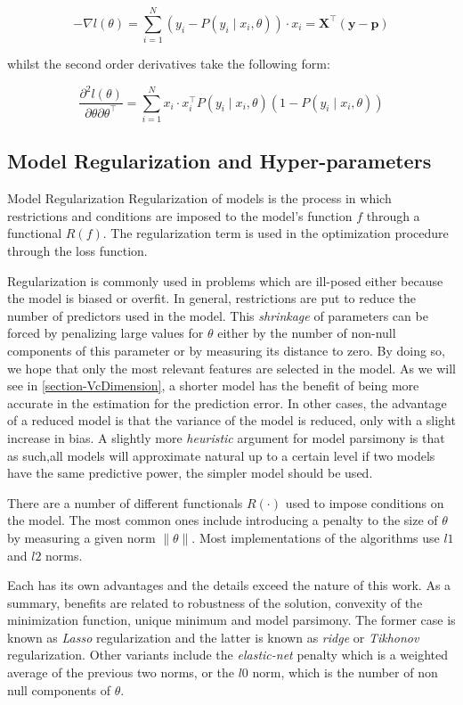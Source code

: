 \[
- \nabla  l(\theta) = \sum_{i=1}^N (y_i - P(y_i \mid x_i,\theta))\cdot x_i = \textbf{X}^{\intercal}(\textbf{y}-\textbf{p})
\]

whilst the second order derivatives take the following form:

\[
\frac{\partial^2 l(\theta)}{\partial \theta \partial \theta^\intercal} = \sum_{i=1}^N x_i \cdot x_i^\intercal P(y_i \mid x_i,\theta)(1 -P(y_i \mid x_i,\theta))
\]



\subsection{Model Regularization and Hyper-parameters}


\begin{definition}{Model Regularization}
	Regularization of models is the process in which restrictions and conditions are imposed  to the model's function $f$ through a functional $ R(f)$. The regularization term is used in the optimization procedure through the loss function.
\end{definition}

Regularization is commonly used in problems which are ill-posed either because the model is biased or overfit. In general, restrictions are put to reduce the number of predictors used in the model. This \textit{shrinkage} of parameters can be forced by penalizing large values for $\theta$ either by the number of non-null components of this parameter or by measuring its distance to zero. By doing so, we hope that only the most relevant features are selected in the model. As we will see in \ref{section-VcDimension}, a shorter model has the benefit of being more accurate in the estimation for the prediction error. In other cases, the advantage of a reduced model is that the variance of the model is reduced, only with a slight increase in bias. A slightly more \textit{heuristic} argument for model parsimony is that as such,all models will approximate natural up to a certain level if two models have the same predictive power, the simpler model should be used.


There are a number of different functionals $R(\cdot)$ used to impose conditions on the model. The most common ones include introducing a penalty to the size of $\theta$ by measuring a given norm  $\| \theta \|$.  Most implementations of the algorithms use $l1$ and $l2$ norms.

 Each has its own advantages and the details exceed the nature of this work. As a summary, benefits are related to robustness of the solution, convexity of the minimization function, unique minimum and model parsimony. The former case is known as \textit{ Lasso} regularization and the latter is known as \textit{ridge} or \textit{Tikhonov} regularization. Other variants include the \textit{elastic-net} penalty which is a weighted average of the previous two norms, or the $l0$ norm, which is the number of non null components of $\theta$. 


